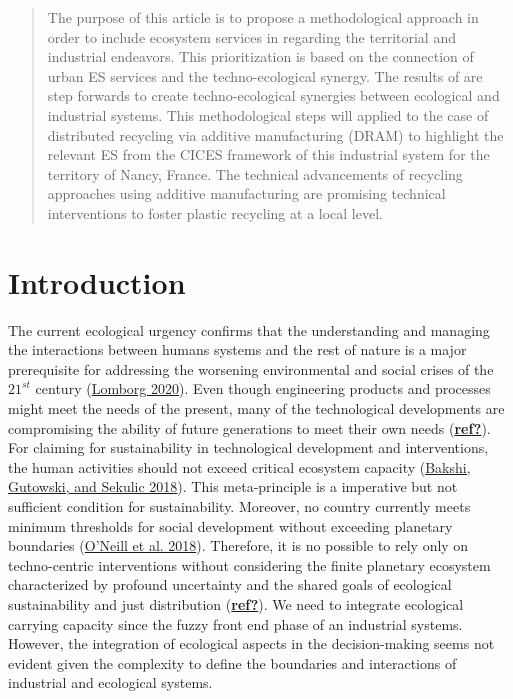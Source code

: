 \documentclass[
]{article}
\begin{document}
\begin{abstract}
The purpose of this article is to propose a methodological approach in order to include ecosystem services in regarding the territorial and industrial endeavors.
This prioritization is based on the connection of urban ES services and the techno-ecological synergy.
The results of are step forwards to create techno-ecological synergies between ecological and industrial systems.
This methodological steps will applied to the case of distributed recycling via additive manufacturing (DRAM) to highlight the relevant ES from the CICES framework of this industrial system for the territory of Nancy, France.
The technical advancements of recycling approaches using additive manufacturing are promising technical interventions to foster plastic recycling at a local level.
\end{abstract}

{
\hypersetup{linkcolor=}
\setcounter{tocdepth}{2}
\tableofcontents
}
\linenumbers

\hypertarget{introduction}{%
\section{Introduction}\label{introduction}}

The current ecological urgency confirms that the understanding and managing the interactions between humans systems and the rest of nature is a major prerequisite for addressing the worsening environmental and social crises of the \(21^{st}\) century (\protect\hyperlink{ref-Lomborg2020}{Lomborg 2020}).
Even though engineering products and processes might meet the needs of the present, many of the technological developments are compromising the ability of future generations to meet their own needs (\protect\hyperlink{ref-ref}{\textbf{ref?}}).
For claiming for sustainability in technological development and interventions, the human activities should not exceed critical ecosystem capacity (\protect\hyperlink{ref-Bakshi2018}{Bakshi, Gutowski, and Sekulic 2018}).
This meta-principle is a imperative but not sufficient condition for sustainability.
Moreover, no country currently meets minimum thresholds for social development without exceeding planetary boundaries (\protect\hyperlink{ref-ONeill2018}{O'Neill et al. 2018}).
Therefore, it is no possible to rely only on techno-centric interventions without considering the finite planetary ecosystem characterized by profound uncertainty and the shared goals of ecological sustainability and just distribution (\protect\hyperlink{ref-ref}{\textbf{ref?}}).
We need to integrate ecological carrying capacity since the fuzzy front end phase of an industrial systems.
However, the integration of ecological aspects in the decision-making seems not evident given the complexity to define the boundaries and interactions of industrial and ecological systems.
\end{document}
